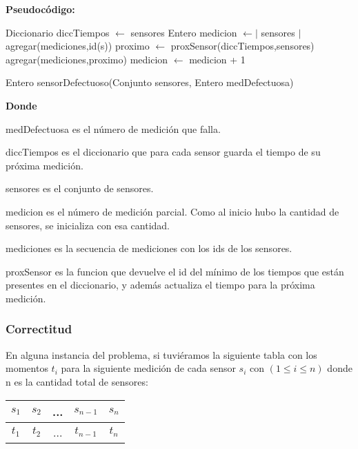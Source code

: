 \textbf{Pseudoc\'odigo:}

\begin{algorithm}[H]
\begin{algorithmic}[1]
\STATE Diccionario diccTiempos  \quad $ \gets $ \quad sensores
\STATE Entero medicion $ \gets \vert$ sensores $ \vert $
\STATE agregar(mediciones,id(s))
\ENDFOR
{}
\STATE proximo \quad $ \gets $ \quad proxSensor(diccTiempos,sensores)
\STATE agregar(mediciones,proximo)
\STATE medicion $ \gets $ medicion + 1
\ENDWHILE
\end{algorithmic}
\caption{Entero sensorDefectuoso(Conjunto sensores, Entero medDefectuosa)}\label{probConjK}
\end{algorithm}



\textbf{Donde}


\quad \quad \quad medDefectuosa es el n\'umero de medici\'on que falla.


\quad \quad \quad diccTiempos es el diccionario que para cada sensor guarda el tiempo de su pr\'oxima medici\'on.


\quad \quad \quad sensores es el conjunto de sensores.


\quad \quad \quad medicion es el n\'umero de medici\'on parcial. Como al inicio hubo la cantidad de sensores, se inicializa con esa cantidad.


\quad \quad \quad mediciones es la secuencia de mediciones con los ids de los sensores.


\quad \quad \quad proxSensor es la funcion que devuelve el id del m\'inimo de los tiempos que est\'an presentes en el diccionario, y adem\'as actualiza el tiempo para la pr\'oxima medici\'on.


\subsubsection{Correctitud}

\quad En alguna instancia del problema, si tuvi\'eramos la siguiente tabla con los momentos $ t_i $ para la siguiente medici\'on de cada sensor $ s_i $ con \quad  $ (1 \leq i \leq n)$ \quad donde n es la cantidad total de sensores:

\begin{tabular}{| c | c | c | c | c |}
\hline
$ s_1 $ & $ s_2 $ & ... & $ s_{n-1} $ & $ s_n $\\
\hline
$ t_1 $ & $ t_2 $ & ... & $ t_{n-1} $ & $ t_n $\\
\hline

\end{tabular}




